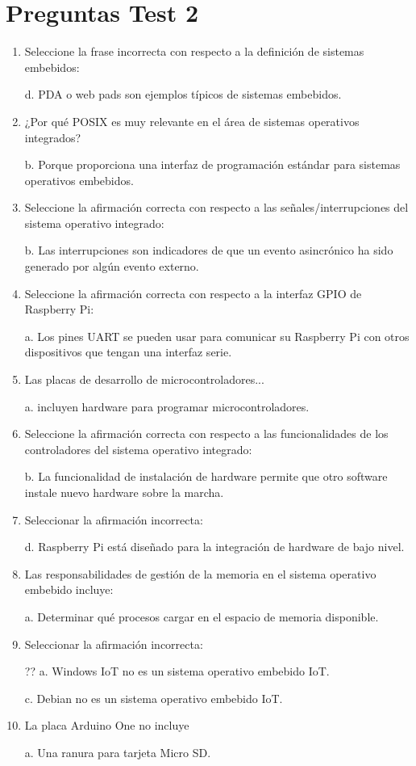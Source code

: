 \documentclass[12pt, twoside, openright]{report} %
\begin{document}
\section{Preguntas Test 2}
\begin{enumerate}
	\item Seleccione la frase incorrecta con respecto a la definición de sistemas embebidos:

	      d. PDA o web pads son ejemplos típicos de sistemas embebidos.

	\item ¿Por qué POSIX es muy relevante en el área de sistemas operativos integrados?

	      b. Porque proporciona una interfaz de programación estándar para sistemas operativos embebidos.

	\item Seleccione la afirmación correcta con respecto a las señales/interrupciones del sistema operativo integrado:

	      b. Las interrupciones son indicadores de que un evento asincrónico ha sido generado por algún evento externo.

	\item Seleccione la afirmación correcta con respecto a la interfaz GPIO de Raspberry Pi:

	      a. Los pines UART se pueden usar para comunicar su Raspberry Pi con otros dispositivos que tengan una interfaz serie.

	\item Las placas de desarrollo de microcontroladores...

	      a. incluyen hardware para programar microcontroladores.

	\item Seleccione la afirmación correcta con respecto a las funcionalidades de los controladores del sistema operativo integrado:

	      b. La funcionalidad de instalación de hardware permite que otro software instale nuevo hardware sobre la marcha.

	\item Seleccionar la afirmación incorrecta:

	      d. Raspberry Pi está diseñado para la integración de hardware de bajo nivel.

	\item Las responsabilidades de gestión de la memoria en el sistema operativo embebido incluye:

	      a. Determinar qué procesos cargar en el espacio de memoria disponible.

	\item Seleccionar la afirmación incorrecta:

	      ?? a. Windows IoT no es un sistema operativo embebido IoT.

	      c. Debian no es un sistema operativo embebido IoT.

	\item La placa Arduino One no incluye

	      a. Una ranura para tarjeta Micro SD.
\end{enumerate}
\end{document}
